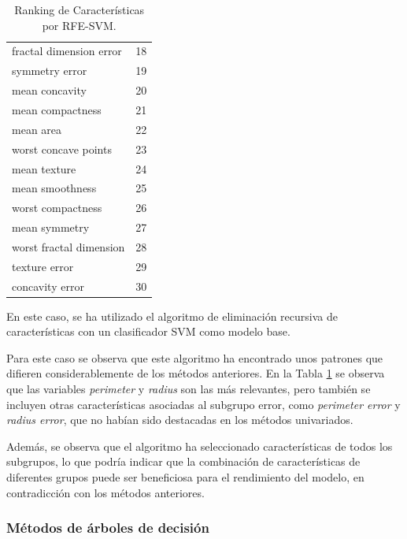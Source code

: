 \documentclass[a4paper,12pt]{article}
\begin{document}
\begin{table}
\begin{tabular}{|l c|}
        fractal dimension error & 18               \\
        symmetry error          & 19               \\
        mean concavity          & 20               \\
        mean compactness        & 21               \\
        mean area               & 22               \\
        worst concave points    & 23               \\
        mean texture            & 24               \\
        mean smoothness         & 25               \\
        worst compactness       & 26               \\
        mean symmetry           & 27               \\
        worst fractal dimension & 28               \\
        texture error           & 29               \\
        concavity error         & 30               \\
        \hline
    \end{tabular}
    \caption{Ranking de Características por RFE-SVM.}
    \label{tab:fselection-RFE-SVM}
\end{table}
En este caso, se ha utilizado el algoritmo de eliminación recursiva de características con un clasificador SVM como modelo base.

Para este caso se observa que este algoritmo ha encontrado unos patrones que difieren considerablemente de los métodos anteriores. En la Tabla \ref{tab:fselection-RFE-SVM} se observa que las variables \textit{perimeter} y \textit{radius} son las más relevantes, pero también se incluyen otras características asociadas al subgrupo error, como \textit{perimeter error} y \textit{radius error}, que no habían sido destacadas en los métodos univariados.

Además, se observa que el algoritmo ha seleccionado características de todos los subgrupos, lo que podría indicar que la combinación de características de diferentes grupos puede ser beneficiosa para el rendimiento del modelo, en contradicción con los métodos anteriores.

\subsubsection{Métodos de árboles de decisión}
\end{document}
